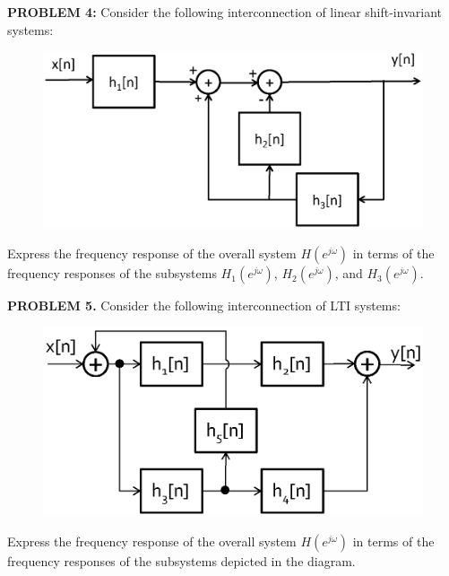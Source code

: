 \documentclass[a4paper,11pt,oneside]{article}
\begin{document}
\vspace{1cm}



\textbf{PROBLEM 4:}  Consider the following interconnection of linear shift-invariant systems:

\begin{figure}[ht!]
\centering
\includegraphics[width=.7\textwidth]{fig1.eps}
\end{figure}

Express the frequency response of the overall system $H(e^{j\omega})$ in terms of the frequency responses of the subsystems $H_1(e^{j\omega})$, $H_2(e^{j\omega})$, and $H_3(e^{j\omega})$.

\vspace{1cm}





\textbf{PROBLEM 5.} Consider the following interconnection of LTI systems:

\begin{figure}[ht!]
\centering
\includegraphics[width=.7\textwidth]{fig3.eps}
\end{figure}

Express the frequency response of the overall system $H(e^{j\omega})$ in terms of the frequency responses of the subsystems depicted in the diagram.

\vspace{1cm}
 
\end{document}
